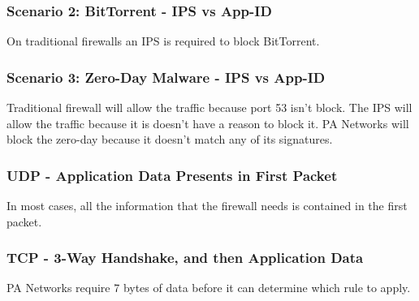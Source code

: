 \subsubsection{Scenario 2:  BitTorrent - IPS vs App-ID}
On traditional firewalls an IPS is required to block BitTorrent. 

\subsubsection{Scenario 3:  Zero-Day Malware - IPS vs App-ID}
Traditional firewall will allow the traffic because port 53 isn't block. The IPS will allow the traffic because it is doesn't have a reason to block it. PA Networks will block the zero-day because it doesn't match any of its signatures.

\subsubsection{UDP - Application Data Presents in First Packet}
In most cases, all the information that the firewall needs is contained in the first packet. 

\subsubsection{TCP - 3-Way Handshake, and then Application Data}
PA Networks require 7 bytes of data before it can determine which rule to apply.

